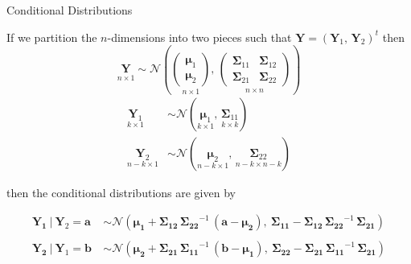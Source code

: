 \documentclass[11pt,ignorenonframetext,]{beamer}
\begin{document}
\begin{frame}[t]{%
\protect\hypertarget{conditional-distributions}{%
Conditional Distributions}}

If we partition the \(n\)-dimensions into two pieces such that
\(\symbf{Y} = (\symbf{Y}_1,\, \symbf{Y}_2)^t\) then \footnotesize \[
\underset{n \times 1}{\symbf{Y}} \sim \mathcal{N}\left(
  \underset{n \times 1}{\begin{pmatrix}\symbf{\mu}_1 \\ \symbf{\mu}_2\end{pmatrix}},\, 
  \underset{n \times n}{\begin{pmatrix} 
    \symbf{\Sigma}_{11} & \symbf{\Sigma}_{12} \\ 
    \symbf{\Sigma}_{21} & \symbf{\Sigma}_{22} 
  \end{pmatrix}}
\right)
\] \[ \begin{aligned}
\underset{k \times 1}{\symbf{Y}_1} &\sim \mathcal{N}(\underset{k \times 1}{\symbf{\mu}_1},\, \underset{k \times k}{\symbf{\Sigma}_{11}}) \\ 
\underset{n-k \times 1}{\symbf{Y}_2} &\sim \mathcal{N}(\underset{n-k \times 1}{\symbf{\mu}_2},\, \underset{n-k \times n-k}{\symbf{\Sigma}_{22}})
\end{aligned} \]

\pause

\normalsize \vspace{2mm}

then the conditional distributions are given by

\footnotesize

\[\begin{aligned}
\symbf{Y_1} ~|~ \symbf{Y}_2 = \symbf{a} ~&\sim \mathcal{N}(\symbf{\mu_1} + \symbf{\Sigma_{12}} \, \symbf{\Sigma_{22}}^{-1} \, (\symbf{a} - \symbf{\mu_2}),~ \symbf{\Sigma_{11}}-\symbf{\Sigma_{12}}\,\symbf{\Sigma_{22}}^{-1} \, \symbf{\Sigma_{21}}) \\
\\
\symbf{Y_2} ~|~ \symbf{Y}_1 = \symbf{b} ~&\sim \mathcal{N}(\symbf{\mu_2} + \symbf{\Sigma_{21}} \, \symbf{\Sigma_{11}}^{-1} \, (\symbf{b} - \symbf{\mu_1}),~ \symbf{\Sigma_{22}}-\symbf{\Sigma_{21}}\,\symbf{\Sigma_{11}}^{-1} \, \symbf{\Sigma_{21}})
\end{aligned}\]

\end{frame}
\end{document}
